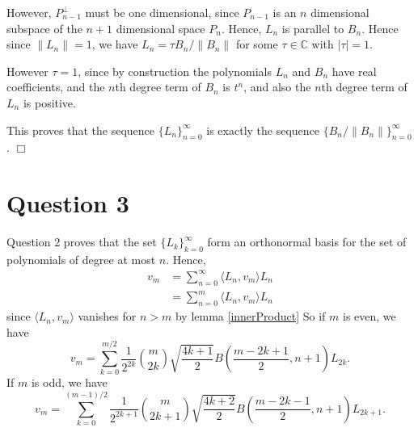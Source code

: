 \documentclass[10pt]{article}
\newenvironment{proof}[1][Proof]{\begin{trivlist}
\item[\hskip \labelsep {\bfseries #1}]}{\end{trivlist}}
\begin{document}
\begin{proof}
            However, $P_{n-1}^\perp$ must be one dimensional, since $P_{n-1}$
            is an $n$ dimensional subspace of the $n+1$ dimensional space $P_n$. Hence, $L_n$ is parallel to $B_n$. 
            Hence since $\|L_n\| = 1$, we have $L_n = \tau B_n/\|B_n\|$ for some
            $\tau \in \mathbb{C}$ with $|\tau| = 1$. 
            
            However $\tau = 1$, since by construction the polynomials $L_n$
            and $B_n$ have real coefficients, and the $n$th degree
            term of $B_n$ is $t^n$, and also the $n$th degree
            term of $L_n$ is positive.
            
            This proves that the sequence $\{L_n\}_{n=0}^\infty$
            is exactly the sequence $\{B_n/\|B_n\|\}_{n=0}^\infty$. $\Box$
        \end{proof}
        
        
        
        \section*{Question 3}
        Question $2$ proves that the set $\{L_k\}_{k=0}^\infty$
        form an orthonormal basis for the set of polynomials of degree at most $n$. Hence,
        \begin{align*}
            v_m &= \sum_{n=0}^\infty \langle L_n,v_m\rangle L_n\\
            &= \sum_{n=0}^m\langle L_n,v_m\rangle L_n
        \end{align*}
        since $\langle L_n,v_m\rangle$ vanishes for $n>m$ by lemma \ref{innerProduct}
        So if $m$ is even, we have
        \begin{equation*}
            v_m = \sum_{k=0}^{m/2}\frac{1}{2^{2k}} {m\choose 2k}\sqrt{\frac{4k+1}{2}}B(\frac{m-2k+1}{2},n+1)L_{2k}.
        \end{equation*}
        If $m$ is odd, we have
        \begin{equation*}
            v_m = \sum_{k=0}^{(m-1)/2} \frac{1}{2^{2k+1}}{m\choose 2k+1}\sqrt{\frac{4k+2}{2}}B(\frac{m-2k-1}{2},n+1)L_{2k+1}.
        \end{equation*}
\end{document}
